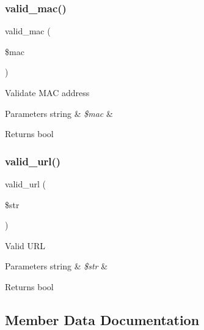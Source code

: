 \subsubsection{\texorpdfstring{valid\+\_\+mac()}{valid\_mac()}}
{\footnotesize\ttfamily valid\+\_\+mac (\begin{DoxyParamCaption}\item[{}]{\$mac }\end{DoxyParamCaption})}

Validate M\+AC address


\begin{DoxyParams}[1]{Parameters}
string & {\em \$mac} & \\
\hline
\end{DoxyParams}
\begin{DoxyReturn}{Returns}
bool 
\end{DoxyReturn}
\mbox{\label{class_c_i___form__validation_a2879cd05a763105684cbad690e5cffd3}} 
\subsubsection{\texorpdfstring{valid\+\_\+url()}{valid\_url()}}
{\footnotesize\ttfamily valid\+\_\+url (\begin{DoxyParamCaption}\item[{}]{\$str }\end{DoxyParamCaption})}

Valid U\+RL


\begin{DoxyParams}[1]{Parameters}
string & {\em \$str} & \\
\hline
\end{DoxyParams}
\begin{DoxyReturn}{Returns}
bool 
\end{DoxyReturn}


\subsection{Member Data Documentation}
\mbox{\label{class_c_i___form__validation_aa1b63acebe8880c36ea51e11a57eb0d3}} 
